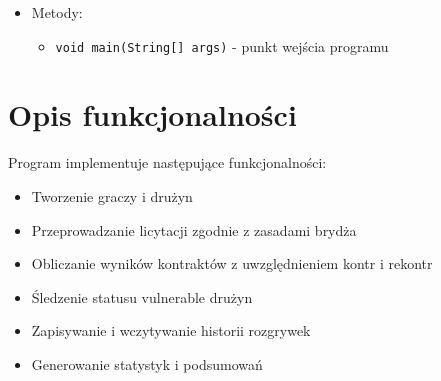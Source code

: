 \documentclass{article}
\begin{document}
\begin{itemize}
    \item Metody:
    \begin{itemize}
        \item \texttt{void main(String[] args)} - punkt wejścia programu
    \end{itemize}
\end{itemize}

\section{Opis funkcjonalności}
Program implementuje następujące funkcjonalności:
\begin{itemize}
    \item Tworzenie graczy i drużyn
    \item Przeprowadzanie licytacji zgodnie z zasadami brydża
    \item Obliczanie wyników kontraktów z uwzględnieniem kontr i rekontr
    \item Śledzenie statusu vulnerable drużyn
    \item Zapisywanie i wczytywanie historii rozgrywek
    \item Generowanie statystyk i podsumowań
\end{itemize}
\end{document}
